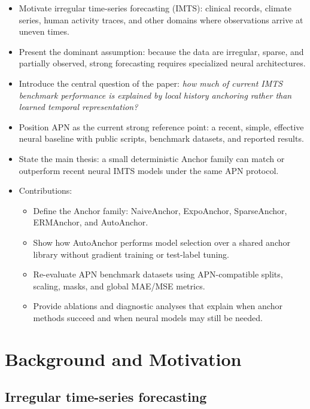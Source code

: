 \documentclass{article}
\newcommand{\method}{AutoAnchor}
\newcommand{\family}{Anchor family}
\begin{document}
\begin{itemize}
    \item Motivate irregular time-series forecasting (IMTS): clinical records,
    climate series, human activity traces, and other domains where observations
    arrive at uneven times.
    \item Present the dominant assumption: because the data are irregular,
    sparse, and partially observed, strong forecasting requires specialized
    neural architectures.
    \item Introduce the central question of the paper: \emph{how much of current
    IMTS benchmark performance is explained by local history anchoring rather
    than learned temporal representation?}
    \item Position APN as the current strong reference point: a recent, simple,
    effective neural baseline with public scripts, benchmark datasets, and
    reported results.
    \item State the main thesis: a small deterministic \family{} can match or
    outperform recent neural IMTS models under the same APN protocol.
    \item Contributions:
    \begin{itemize}
        \item Define the \family{}: NaiveAnchor, ExpoAnchor, SparseAnchor,
        ERMAnchor, and \method{}.
        \item Show how \method{} performs model selection over a shared anchor
        library without gradient training or test-label tuning.
        \item Re-evaluate APN benchmark datasets using APN-compatible splits,
        scaling, masks, and global MAE/MSE metrics.
        \item Provide ablations and diagnostic analyses that explain when anchor
        methods succeed and when neural models may still be needed.
    \end{itemize}
\end{itemize}

\section{Background and Motivation}

\subsection{Irregular time-series forecasting}
\end{document}
